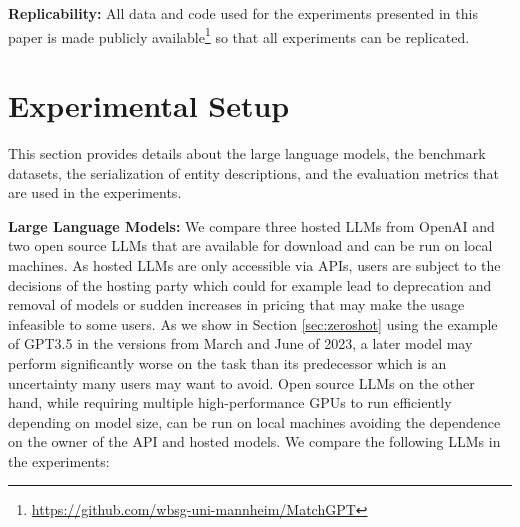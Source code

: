 \documentclass[sigconf,nonacm]{acmart}
\begin{document}
\textbf{Replicability:} All data and code used for the experiments presented in this paper is made publicly available\footnote{\url{https://github.com/wbsg-uni-mannheim/MatchGPT}} so that all experiments can be replicated. \section{Experimental Setup}
\label{sec:experimentalsetup}

This section provides details about the large language models, the benchmark datasets, the serialization of entity descriptions, and the evaluation metrics that are used in the experiments.

\textbf{Large Language Models:} We compare three hosted LLMs from OpenAI and two open source LLMs that are available for download and can be run on local machines. As hosted LLMs are only accessible via APIs, users are subject to the decisions of the hosting party which could for example lead to deprecation and removal of models or sudden increases in pricing that may make the usage infeasible to some users. As we show in Section \ref{sec:zeroshot} using the example of GPT3.5 in the versions from March and June of 2023, a later model may perform significantly worse on the task than its predecessor which is an uncertainty many users may want to avoid. Open source LLMs on the other hand, while requiring multiple high-performance GPUs to run efficiently depending on model size, can be run on local machines avoiding the dependence on the owner of the API and hosted models.
We compare the following LLMs in the experiments:
\end{document}

